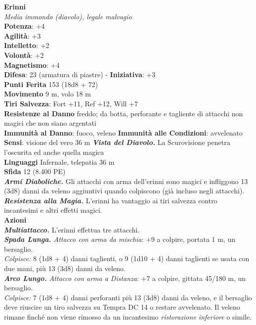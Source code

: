 \begin{multicols}{2}
\medskip\textbf{Erinni}\\
\emph{Media immondo (diavolo), legale malvagio}\\
\textbf{Potenza}: +4\\
\textbf{Agilità}: +3\\
\textbf{Intelletto}: +2\\
\textbf{Volontà}: +2\\
\textbf{Magnetismo}: +4\\
\textbf{Difesa}: 23 (armatura di piastre) - \textbf{Iniziativa}: +3\\
\textbf{Punti Ferita} 153 (18d8 + 72)\\
\textbf{Movimento} 9 m, volo 18 m\\
\textbf{Tiri Salvezza}: Fort +11, Ref +12, Will +7\\
\textbf{Resistenze al Danno} freddo; da botta, perforante e tagliente di attacchi non magici che non siano argentati\\
\textbf{Immunità al Danno}: fuoco, veleno
\textbf{Immunità alle Condizioni}: avvelenato\\
\textbf{Sensi}: visione del vero 36 m
\emph{\textbf{Vista del Diavolo.}} La Scurovisione penetra l'oscurita ed anche quella magica\\
\textbf{Linguaggi} Infernale, telepatia 36 m \\
\textbf{Sfida} 12 (8.400 PE)\smallskip\\
\emph{\textbf{Armi Diaboliche.}} Gli attacchi con arma dell'erinni sono magici e infliggono 13 (3d8) danni da veleno aggiuntivi quando colpiscono (già incluso negli attacchi).\\
\emph{\textbf{Resistenza alla Magia.}} L'erinni ha vantaggio ai tiri salvezza contro incantesimi e altri effetti magici.\\
\smallskip\textbf{Azioni}\\
\emph{\textbf{Multiattacco.}} L'erinni effettua tre attacchi.\\
\emph{\textbf{Spada Lunga.} Attacco con arma da mischia}: +9 a colpire, portata 1 m, un bersaglio.\\
\emph{Colpisce:} 8 (1d8 + 4) danni taglienti, o 9 (1d10 + 4) danni taglienti se usata con due mani, più 13 (3d8) danni da veleno. \\
\emph{\textbf{Arco Lungo.} Attacco con arma a Distanza}: +7 a colpire, gittata 45/180 m, un bersaglio. \\
\emph{Colpisce:} 7 (1d8 + 4) danni perforanti più 13 (3d8) danni da veleno, e il bersaglio deve riuscire un tiro salvezza su Tempra DC 14 o restare avvelenato. Il veleno rimane finché non viene rimosso da un incantesimo \emph{ristorazione inferiore} o simile.\\

\end{multicols}
